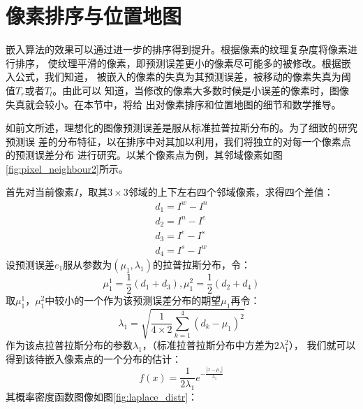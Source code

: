 \section{像素排序与位置地图}
嵌入算法的效果可以通过进一步的排序得到提升。根据像素的纹理复杂度将像素进行排序，
使纹理平滑的像素，即预测误差更小的像素尽可能多的被修改。根据嵌入公式，我们知道，
被嵌入的像素的失真为其预测误差，被移动的像素失真为阈值$T_r$或者$T_l$。由此可以
知道，当修改的像素大多数时候是小误差的像素时，图像失真就会较小。在本节中，将给
出对像素排序和位置地图的细节和数学推导。
\par
如前文所述，理想化的图像预测误差是服从标准拉普拉斯分布的。为了细致的研究预测误
差的分布特征，以在排序中对其加以利用，我们将独立的对每一个像素点的预测误差分布
进行研究。以某个像素点为例，其邻域像素如图\ref{fig:pixel_neighbour2}所示。
\par
首先对当前像素$I$，取其$3\times3$邻域的上下左右四个邻域像素，求得四个差值：
\begin{eqnarray}                           
  & d_1=I^w-I^n & \\
  & d_2=I^n-I^e & \\
  & d_3=I^e-I^s & \\
  & d_4=I^s-I^w &
\end{eqnarray}
设预测误差$e_1$服从参数为$(\mu_1,\lambda_1)$的拉普拉斯分布，令：
\begin{equation}
  \mu_1^1=\frac{1}{2}(d_1+d_3), \mu_1^2=\frac{1}{2}(d_2+d_4)
\end{equation}
取$\mu_1^1$，$\mu_1^2$中较小的一个作为该预测误差分布的期望$\mu_1$再令：
\begin{equation}
  \lambda_1=\sqrt{\frac{1}{4\times2}\sum_{k=1}^{4}(d_k-\mu_1)^2}
\end{equation}
作为该点拉普拉斯分布的参数$\lambda_1$，（标准拉普拉斯分布中方差为$2\lambda_1^2$），
我们就可以得到该待嵌入像素点的一个分布的估计：
\begin{equation}
  f(x)=\frac{1}{2\lambda_1}e^{-\frac{|x-\mu_1|}{\lambda_1}}
  \label{eq:laplace_distr}
\end{equation}
其概率密度函数图像如图\ref{fig:laplace_distr}：
